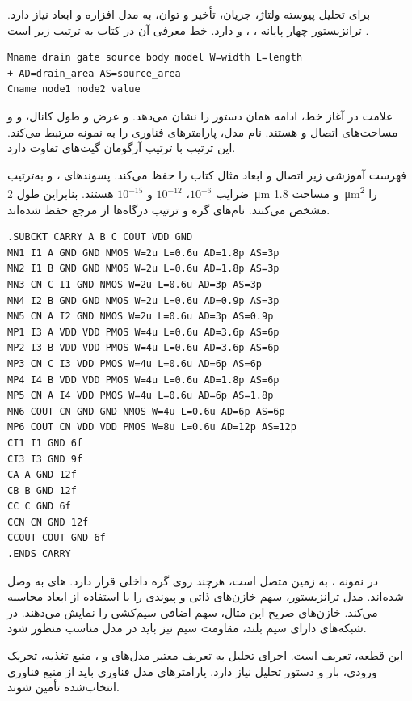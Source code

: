 برای تحلیل پیوسته ولتاژ، جریان، تأخیر و توان،  به مدل افزاره و ابعاد نیاز
دارد. ترانزیستور  چهار پایانه ، ،  و
 دارد. خط معرفی آن در کتاب به ترتیب زیر است
\cite[صفحات ۴۴ و ۴۵]{weste}.
\begin{latin}
\small
\begin{verbatim}
Mname drain gate source body model W=width L=length
+ AD=drain_area AS=source_area
Cname node1 node2 value
\end{verbatim}
\end{latin}
علامت \code{+} در آغاز خط، ادامه همان دستور را نشان می‌دهد.  و
 عرض و طول کانال، و  و  مساحت‌های اتصال
 و  هستند. نام مدل، پارامترهای فناوری را به نمونه مرتبط می‌کند.
این ترتیب با ترتیب آرگومان گیت‌های  تفاوت دارد.

فهرست  آموزشی زیر اتصال و ابعاد مثال کتاب را حفظ می‌کند. پسوندهای
،  و  به‌ترتیب ضرایب \(10^{-6}\)، \(10^{-12}\) و
\(10^{-15}\) هستند. بنابراین  طول \qty{2}{\micro\metre} و
 مساحت \qty{1.8}{\micro\metre\squared} را مشخص می‌کنند.
نام‌های گره و ترتیب درگاه‌ها از مرجع حفظ شده‌اند.
\begin{latin}
\footnotesize
\begin{verbatim}
.SUBCKT CARRY A B C COUT VDD GND
MN1 I1 A GND GND NMOS W=2u L=0.6u AD=1.8p AS=3p
MN2 I1 B GND GND NMOS W=2u L=0.6u AD=1.8p AS=3p
MN3 CN C I1 GND NMOS W=2u L=0.6u AD=3p AS=3p
MN4 I2 B GND GND NMOS W=2u L=0.6u AD=0.9p AS=3p
MN5 CN A I2 GND NMOS W=2u L=0.6u AD=3p AS=0.9p
MP1 I3 A VDD VDD PMOS W=4u L=0.6u AD=3.6p AS=6p
MP2 I3 B VDD VDD PMOS W=4u L=0.6u AD=3.6p AS=6p
MP3 CN C I3 VDD PMOS W=4u L=0.6u AD=6p AS=6p
MP4 I4 B VDD VDD PMOS W=4u L=0.6u AD=1.8p AS=6p
MP5 CN A I4 VDD PMOS W=4u L=0.6u AD=6p AS=1.8p
MN6 COUT CN GND GND NMOS W=4u L=0.6u AD=6p AS=6p
MP6 COUT CN VDD VDD PMOS W=8u L=0.6u AD=12p AS=12p
CI1 I1 GND 6f
CI3 I3 GND 9f
CA A GND 12f
CB B GND 12f
CC C GND 6f
CCN CN GND 12f
CCOUT COUT GND 6f
.ENDS CARRY
\end{verbatim}
\end{latin}
در نمونه ،  به زمین متصل است، هرچند  روی گره
داخلی  قرار دارد. های  به  وصل شده‌اند.
مدل ترانزیستور، سهم خازن‌های ذاتی و پیوندی را با استفاده از ابعاد محاسبه می‌کند.
خازن‌های صریح این مثال، سهم اضافی سیم‌کشی را نمایش می‌دهند. در شبکه‌های دارای
سیم بلند، مقاومت سیم نیز باید در مدل مناسب منظور شود.

این قطعه، تعریف  است. اجرای تحلیل به تعریف معتبر مدل‌های
 و ، منبع تغذیه، تحریک ورودی، بار و دستور تحلیل نیاز دارد.
پارامترهای مدل فناوری باید از منبع فناوری انتخاب‌شده تأمین شوند.

